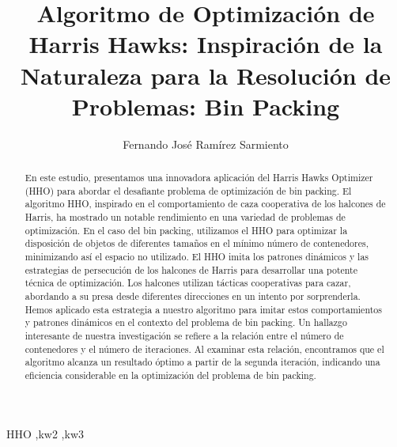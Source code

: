 \documentclass[final,5p,times,twocolumn]{elsarticle}
\def\corref#1{}%
\begin{document}
\begin{frontmatter}

\title{Algoritmo de Optimización de Harris Hawks: Inspiración de la Naturaleza para la Resolución de Problemas: Bin Packing}

\author[uv]{Fernando José Ramírez Sarmiento\corref{cor}}

\address[uv]{Escuela de Ingenier\'ia Inform\'atica, Universidad de Valpara\'iso, Valpara\'iso, Chile.}

\begin{abstract}
En este estudio,\autocite{Fernando2023} presentamos una innovadora aplicación del Harris Hawks Optimizer (HHO) para abordar el desafiante problema de optimización de bin packing. El algoritmo HHO, inspirado en el comportamiento de caza cooperativa de los halcones de Harris, ha mostrado un notable rendimiento en una variedad de problemas de optimización. En el caso del bin packing, utilizamos el HHO para optimizar la disposición de objetos de diferentes tamaños en el mínimo número de contenedores, minimizando así el espacio no utilizado.
El HHO imita los patrones dinámicos y las estrategias de persecución de los halcones de Harris para desarrollar una potente técnica de optimización. Los halcones utilizan tácticas cooperativas para cazar, abordando a su presa desde diferentes direcciones en un intento por sorprenderla. Hemos aplicado esta estrategia a nuestro algoritmo para imitar estos comportamientos y patrones dinámicos en el contexto del problema de bin packing.
Un hallazgo interesante de nuestra investigación se refiere a la relación entre el número de contenedores y el número de iteraciones. Al examinar esta relación, encontramos que el algoritmo alcanza un resultado óptimo a partir de la segunda iteración, indicando una eficiencia considerable en la optimización del problema de bin packing.
\end{abstract}


\begin{keyword}
HHO \sep kw2 \sep kw3 
\end{keyword}

\end{frontmatter}

\end{document}
